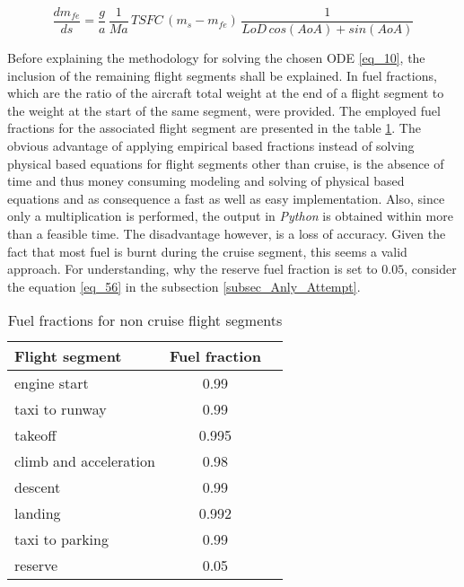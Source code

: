 \begin{equation}
    \label{eq_10}  
    \frac{dm_{fe}}{ds} = \frac{g}{a} \, \frac{1}{Ma}\,TSFC \,(m_s - m_{fe})
    \, \frac{1}{
        LoD \, cos(AoA) + sin(AoA)}  
\end{equation}

Before explaining the methodology for solving the chosen ODE 
\eqref{eq_10}, the inclusion of the remaining flight segments shall 
be explained. In \cite{roskam_airplane_1986} fuel 
fractions, which are the ratio of the aircraft total 
weight at the end of a flight segment to the weight at the start 
of the same segment,
were provided. The employed fuel fractions 
for the associated flight segment are presented in the 
table \ref{tab_1}. The obvious advantage of applying 
empirical based fractions instead of solving physical based equations 
for flight segments other than cruise, is the 
absence of time and thus money consuming modeling
and solving of 
physical based equations and as consequence a 
fast as well as easy implementation.
Also, since only a multiplication is performed, the output 
in \emph{Python} is obtained within more than a feasible time. The 
disadvantage however, is a loss of accuracy. Given the fact that 
most fuel is burnt during the cruise segment, this seems 
a valid approach. For understanding, why the reserve fuel 
fraction is set to $0.05$, consider the 
equation \eqref{eq_56} in the
subsection \ref{subsec_Anly_Attempt}.

\begin{table}[!h]
    \centering
    \begin{tabular}{|l|c|c|}
        \hline
        Flight segment & Fuel fraction\\
        \hline
        engine start & 0.99 \\
        taxi to runway & 0.99 \\
        takeoff & 0.995 \\
        climb and acceleration & 0.98 \\
        descent &  0.99 \\
        landing &  0.992 \\
        taxi to parking &  0.99\\
        reserve &  0.05\\
        \hline
    \end{tabular}
    \caption{Fuel fractions for non cruise flight segments }
	\label{tab_1}
\end{table}



